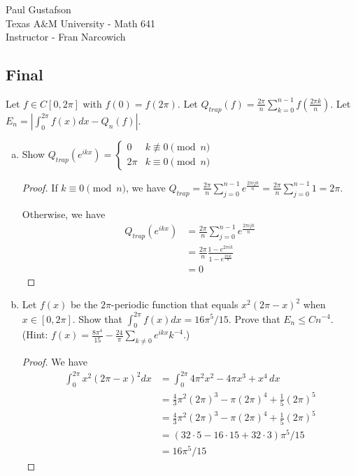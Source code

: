 \documentclass{article}
\begin{document}
\noindent Paul Gustafson\\
\noindent Texas A\&M University - Math 641\\ 
\noindent Instructor - Fran Narcowich

\subsection*{Final}
 Let $f \in C[0,2 \pi]$ with $f(0) = f(2\pi)$.  Let 
$Q_{trap}(f) =  \frac {2\pi} n \sum_{k=0}^{n-1} f \left(\frac {2 \pi k} n \right)$.
Let $E_n = \left| \int_0^{2 \pi} f(x) dx - Q_n(f) \right|$.

\begin{enumerate}[(a)]
\item Show $Q_{trap}(e^{ikx}) = \left\{ 
\begin{array}{ll}
0 & k \not\equiv 0 \pmod n
\\ 2\pi & k \equiv 0 \pmod n
\end{array}
\right.$

\begin{proof}
If $k \equiv 0 \pmod n$, we have $Q_{trap} = \frac {2\pi} n \sum_{j=0}^{n-1} e^{\frac {2 \pi i jk} n} = \frac{2 \pi}{n} \sum_{j=0}^{n-1} 1 = 2\pi$.

Otherwise, we have 
\begin{align*}
Q_{trap}(e^{ikx}) & = \frac {2\pi} n \sum_{j=0}^{n-1} e^{\frac {2 \pi i jk} n}
\\ & = \frac {2\pi} n \frac{1 -  e^{2 \pi i k}}{1 - e^{\frac {2 \pi i k} n}}
\\ & = 0
\end{align*}
\end{proof}

\item Let $f(x)$ be the $2 \pi$-periodic function that equals $x^2(2\pi - x)^2$ when $x \in [0, 2\pi]$. Show that $\int_0^{2\pi} f(x) dx = 16 \pi^5/15$. Prove that $E_n \le C n^{-4}$.  
(Hint: $f(x) = \frac{8\pi^4}{15} - \frac{24}{\pi} \sum_{k \neq 0} e^{ikx} k^{-4}$.)

\begin{proof}
We have
\begin{align*}
\int_0^{2 \pi} x^2(2\pi - x)^2 dx & = \int_0^{2 \pi} 4\pi^2 x^2 - 4 \pi x^3 + x^4 \, dx
\\ & = \frac 4 3 \pi^2 (2\pi)^3 - \pi(2 \pi)^4 + \frac 1 5 (2 \pi)^5
\\ & = \frac 4 3 \pi^2 (2\pi)^3 - \pi(2 \pi)^4 + \frac 1 5 (2 \pi)^5
\\ & = (32 \cdot 5 - 16 \cdot 15 + 32 \cdot 3) \pi^5/15
\\ & = 16 \pi^5/15
\end{align*}


\end{proof}
\end{enumerate}
\end{document}
